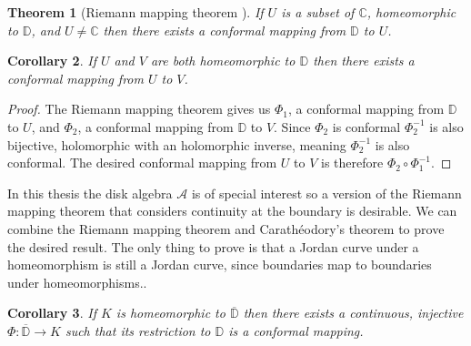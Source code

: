 \documentclass[a4paper,12pt,twoside,BCOR=10mm]{scrbook}
\newtheorem{theorem}{Theorem}[section]
\newtheorem{corollary}[theorem]{Corollary}
\theoremstyle{definition}
\theoremstyle{definition}
\theoremstyle{definition}
\begin{document}
\begin{theorem}[Riemann mapping theorem \citep{greenkrantz}]
If $U$ is a subset of $\mathbb{C}$, homeomorphic to $\mathbb{D}$, and $U \neq \mathbb{C}$ then there exists a conformal mapping from $\mathbb{D}$ to $U$.
\end{theorem}
\begin{corollary}
If $U$ and $V$ are both homeomorphic to $\mathbb{D}$ then there exists a conformal mapping from $U$ to $V$.
\end{corollary}
\begin{proof}
The Riemann mapping theorem gives us $\Phi_1$, a conformal mapping from $\mathbb{D}$ to $U$, and $\Phi_2$, a conformal mapping from $\mathbb{D}$ to $V$.
Since $\Phi_2$ is conformal $\Phi_2^{-1}$ is also bijective, holomorphic with an holomorphic inverse, meaning $\Phi_2^{-1}$ is also conformal.
The desired conformal mapping from $U$ to $V$ is therefore $\Phi_2 \circ \Phi_1^{-1}$.
\end{proof}
In this thesis the disk algebra $\mathcal{A}$ is of special interest so a version of the Riemann mapping theorem that considers continuity at the boundary is desirable.
We can combine the Riemann mapping theorem and Carathéodory's theorem to prove the desired result.
The only thing to prove is that a Jordan curve under a homeomorphism is still a Jordan curve, since boundaries map to boundaries under homeomorphisms..
\begin{corollary}
\label{contrmt}
If $K$ is homeomorphic to $\overline{\mathbb{D}}$ then there exists a continuous, injective $\Phi: \overline{\mathbb{D}} \rightarrow K$ such that its restriction to $\mathbb{D}$ is a conformal mapping.
\end{corollary}
\end{document}
